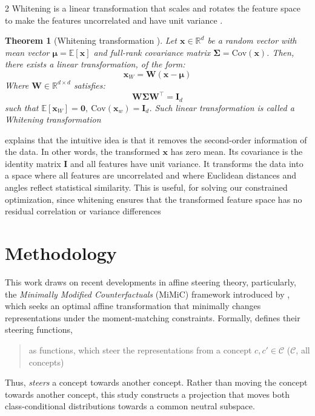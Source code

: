 \documentclass[ecta,nameyear,final]{econsocart}
\numberwithin{equation}{section}
\theoremstyle{plain}
\newtheorem{theorem}{Theorem}
\theoremstyle{definition}
\begin{document}
\begin{multicols}{2}
\newline \newline
Whitening is a linear transformation that scales and rotates the feature space to make the features uncorrelated and have unit variance \citep{kalapos2024whiteningconsistentlyimprovesselfsupervised}.
\begin{theorem}[Whitening transformation \citep{Hyvärinen2009}]
    Let $\mathbf{x} \in \mathbb{R}^d$ be a random vector with mean vector $\boldsymbol{\mu} = \mathbb{E}[\mathbf{x}]$ and full-rank covariance matrix $\boldsymbol{\Sigma} = \text{Cov}(\mathbf{x})$. Then, there exists a linear transformation, of the form:
    $$
    \mathbf{x}_W = \mathbf{W}(\mathbf{x} - \boldsymbol{\mu})
    $$
    Where $\mathbf{W} \in \mathbb{R}^{d \times d}$ satisfies:
    $$
    \mathbf{W}\boldsymbol{\Sigma}\mathbf{W}^{\top} = \mathbf{I}_d
    $$
    such that $\mathbb{E}[\mathbf{x}_W] = \mathbf{0}, \ \text{Cov}(\mathbf{x}_w) = \mathbf{I}_d$.
    Such linear transformation is called a \emph{Whitening transformation} 
\end{theorem}
\cite{Hyvärinen2009} explains that the intuitive idea is that it removes the second-order information of the data.
\newline \newline
In other words, the transformed $\mathbf{x}$ has zero mean. Its covariance is the identity matrix $\mathbf{I}$ and all features have unit variance. It transforms the data into a space where all features are uncorrelated and where Euclidean distances and angles reflect statistical similarity.
\newline \newline
This is useful, for solving our constrained optimization, since whitening ensures that the transformed feature space has no residual correlation or variance differences
\section{Methodology}
This work draws on recent developments in affine steering theory, particularly, the \emph{Minimally Modified Counterfactuals} (MiMiC) framework introduced by \cite{Shashwat2024}, which seeks an optimal affine transformation that minimally changes representations under the moment-matching constraints. Formally, \cite{Shashwat2024} defines their steering functions, 
\begin{quote}
    as functions, which steer the representations from a concept $c, c' \in \mathcal{C}$ ($\mathcal{C}$, all concepts)
\end{quote}
Thus, \emph{steers} a concept towards another concept.
\newline\newline
Rather than moving the concept towards another concept, this study constructs a projection that moves both class-conditional distributions towards a common neutral subspace.


\end{multicols}
\end{document}
